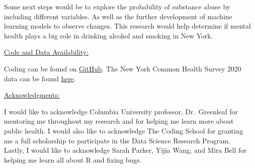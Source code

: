 \documentclass[
]{article}
\begin{document}
Some next steps would be to explore the probability of substance abuse
by including different variables. As well as the further development of
machine learning models to observe changes. This research would help
determine if mental health plays a big role in drinking alcohol and
smoking in New York.

\ul{Code and Data Availability:}

Coding can be found on
\href{github.com/the-codingschool/DSRP-2023-Greenleaf/tree/main/Esenia}{GitHub}.
The New York Common Health Survey 2020 data can be found
\href{https://www.nyc.gov/site/doh/data/data-sets/community-health-survey-public-use-data.page}{here}.

\ul{Acknowledgments:}

I would like to acknowledge Columbia University professor, Dr.~Greenleaf
for mentoring me throughout my research and for helping me learn more
about public health. I would also like to acknowledge The Coding School
for granting me a full scholarship to participate in the Data Science
Research Program. Lastly, I would like to acknowledge Sarah Parker,
Yijia Wang, and Mira Bell for helping me learn all about R and fixing
bugs.
\end{document}
